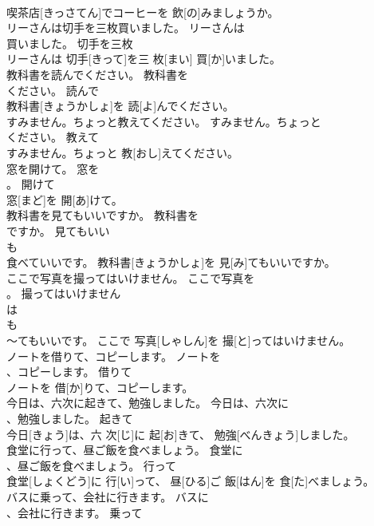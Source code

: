 \documentclass[8pt]{extreport}
\begin{document}
\begin{CJK}{UTF8}{min}
\\	喫茶店[きっさてん]でコーヒーを 飲[の]みましょうか。	
\\	リーさんは切手を三枚買いました。	リーさんは
\\	買いました。	切手を三枚	
\\	リーさんは 切手[きって]を三 枚[まい] 買[か]いました。	
\\	教科書を読んでください。	教科書を
\\	ください。	読んで	
\\	教科書[きょうかしょ]を 読[よ]んでください。	
\\	すみません。ちょっと教えてください。	すみません。ちょっと
\\	ください。	教えて	
\\	すみません。ちょっと 教[おし]えてください。	
\\	窓を開けて。	窓を
\\	。	開けて	
\\	窓[まど]を 開[あ]けて。	
\\	教科書を見てもいいですか。	教科書を
\\	ですか。	見てもいい	
\\	も 
\\	食べていいです。	教科書[きょうかしょ]を 見[み]てもいいですか。	
\\	ここで写真を撮ってはいけません。	ここで写真を
\\	。	撮ってはいけません	
\\	は 
\\	も 
\\	～てもいいです。	ここで 写真[しゃしん]を 撮[と]ってはいけません。	
\\	ノートを借りて、コピーします。	ノートを
\\	、コピーします。	借りて	
\\	ノートを 借[か]りて、コピーします。	
\\	今日は、六次に起きて、勉強しました。	今日は、六次に
\\	、勉強しました。	起きて	
\\	今日[きょう]は、六 次[じ]に 起[お]きて、 勉強[べんきょう]しました。	
\\	食堂に行って、昼ご飯を食べましょう。	食堂に
\\	、昼ご飯を食べましょう。	行って	
\\	食堂[しょくどう]に 行[い]って、 昼[ひる]ご 飯[はん]を 食[た]べましょう。	
\\	バスに乗って、会社に行きます。	バスに
\\	、会社に行きます。	乗って	

\end{CJK}
\end{document}
